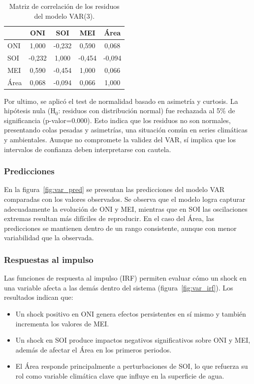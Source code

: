 \begin{table}[H]
    \centering
    \caption{Matriz de correlación de los residuos del modelo VAR(3).}
    \label{tab:var_corr_resid}
    \begin{tabular}{lcccc}
        \toprule
               & ONI & SOI & MEI & Área \\
        \midrule
        ONI     & 1,000 & -0,232 &  0,590 &  0,068 \\
        SOI     & -0,232 & 1,000 & -0,454 & -0,094 \\
        MEI     & 0,590 & -0,454 &  1,000 &  0,066 \\
        Área    & 0,068 & -0,094 &  0,066 &  1,000 \\
        \bottomrule
    \end{tabular}
\end{table}

Por ultimo, se aplicó el test de normalidad basado en asimetría y curtosis. La hipótesis nula (H$_0$: residuos con distribución normal) fue rechazada al 5\% de significancia (p-valor=0.000). Esto indica que los residuos no son normales, presentando colas pesadas y asimetrías, una situación común en series climáticas y ambientales. Aunque no compromete la validez del VAR, sí implica que los intervalos de confianza deben interpretarse con cautela.

\subsubsection{Predicciones}
En la figura~\ref{fig:var_pred} se presentan las predicciones del modelo VAR comparadas con los valores observados. Se observa que el modelo logra capturar adecuadamente la evolución de ONI y MEI, mientras que en SOI las oscilaciones extremas resultan más difíciles de reproducir. En el caso del Área, las predicciones se mantienen dentro de un rango consistente, aunque con menor variabilidad que la observada.

\subsubsection{Respuestas al impulso}
Las funciones de respuesta al impulso (IRF) permiten evaluar cómo un shock en una variable afecta a las demás dentro del sistema (figura~\ref{fig:var_irf}). Los resultados indican que:

\begin{itemize}
    \item Un shock positivo en ONI genera efectos persistentes en sí mismo y también incrementa los valores de MEI.
    \item Un shock en SOI produce impactos negativos significativos sobre ONI y MEI, además de afectar el Área en los primeros periodos.
    \item El Área responde principalmente a perturbaciones de SOI, lo que refuerza su rol como variable climática clave que influye en la superficie de agua.
\end{itemize}


